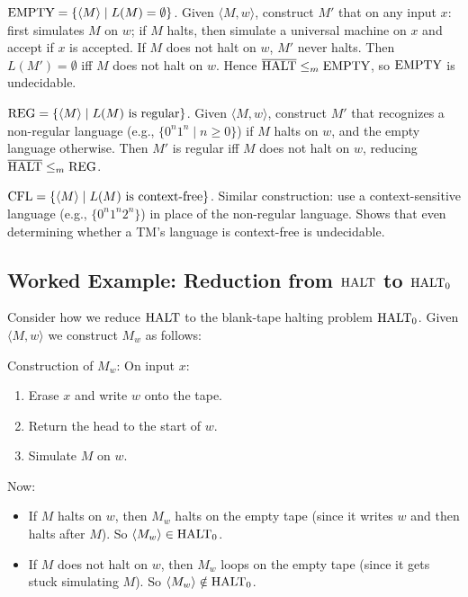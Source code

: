 \begin{example}
$\text{EMPTY} = \{ \langle M \rangle \mid L(M) = \emptyset \}$.
Given $\langle M, w \rangle$, construct $M'$ that on any input $x$: first simulates $M$ on $w$; if $M$ halts, then simulate a universal machine on $x$ and accept if $x$ is accepted. If $M$ does not halt on $w$, $M'$ never halts. Then $L(M') = \emptyset$ iff $M$ does not halt on $w$. Hence $\overline{\text{HALT}} \le_m \text{EMPTY}$, so $\text{EMPTY}$ is undecidable.
\end{example}

\begin{example}
$\text{REG} = \{ \langle M \rangle \mid L(M) \text{ is regular} \}$.
Given $\langle M, w \rangle$, construct $M'$ that recognizes a non-regular language (e.g., $\{0^n 1^n \mid n \ge 0\}$) if $M$ halts on $w$, and the empty language otherwise. Then $M'$ is regular iff $M$ does not halt on $w$, reducing $\overline{\text{HALT}} \le_m \text{REG}$.
\end{example}

\begin{example}
$\text{CFL} = \{ \langle M \rangle \mid L(M) \text{ is context-free} \}$.
Similar construction: use a context-sensitive language (e.g., $\{0^n 1^n 2^n\}$) in place of the non-regular language. Shows that even determining whether a TM's language is context-free is undecidable.
\end{example}

\subsection*{Worked Example: Reduction from $\text{HALT}$ to $\text{HALT}_0$}

Consider how we reduce $\text{HALT}$ to the blank-tape halting problem $\text{HALT}_0$. Given $\langle M, w \rangle$ we construct $M_w$ as follows:

Construction of $M_w$: On input $x$:
\begin{enumerate}
\item Erase $x$ and write $w$ onto the tape.
\item Return the head to the start of $w$.
\item Simulate $M$ on $w$.
\end{enumerate}

Now:
\begin{itemize}
\item If $M$ halts on $w$, then $M_w$ halts on the empty tape (since it writes $w$ and then halts after $M$). So $\langle M_w \rangle \in \text{HALT}_0$.
\item If $M$ does not halt on $w$, then $M_w$ loops on the empty tape (since it gets stuck simulating $M$). So $\langle M_w \rangle \notin \text{HALT}_0$.
\end{itemize}

